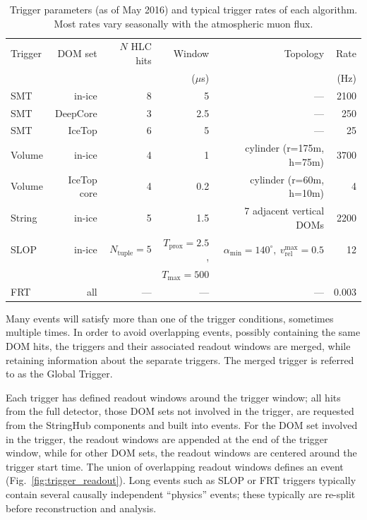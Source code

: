 \begin{table}
  \centering \footnotesize
\caption{Trigger parameters (as of May 2016) and typical trigger
  rates of each algorithm.  Most rates vary seasonally with the atmospheric
  muon flux.}  
\begin{tabular}{lrrrrr}
  \hline Trigger & DOM set & $N$ HLC hits & Window & Topology & Rate\\
  & & & ($\mu$s) & & (Hz) \\
  \hline
  SMT & in-ice & 8 & 5 & --- & 2100\\
  SMT & DeepCore & 3 & 2.5 & --- & 250\\
  SMT & IceTop & 6 & 5 & --- & 25\\
  Volume & in-ice & 4 & 1 & cylinder (r=175m, h=75m) & 3700\\
  Volume & IceTop core & 4 & 0.2 & cylinder (r=60m, h=10m) & 4\\
  String & in-ice & 5 & 1.5 & 7 adjacent vertical DOMs & 2200\\
  SLOP & in-ice & $N_{\mathrm{tuple}} = 5$ & $T_{\mathrm{prox}} = 2.5$, &
  $\alpha_{\mathrm{min}} = 140^\circ,\ v_{\mathrm{rel}}^{\mathrm{max}} = 0.5$ & 12\\
  & & & $T_{\mathrm{max}} = 500$ & &\\
  FRT & all & --- & --- & --- & 0.003\\
  \hline
\end{tabular}
\label{tab:triggers}
\end{table}

Many events will satisfy more than one of the trigger conditions, sometimes
multiple times.  In order to avoid overlapping events, possibly containing
the same DOM hits, the triggers and their associated readout windows are
merged, while retaining information about the separate triggers.  The
merged trigger is referred to as the Global Trigger.

Each trigger has defined readout windows around the trigger window; all
hits from the full detector, those DOM sets not involved in the trigger,
are requested from the StringHub components and built into events.  For the
DOM set involved in the trigger, the readout windows are appended at the end of the trigger
window, while for other DOM sets, the readout windows are centered around
the trigger start time.  The union of overlapping readout windows defines
an event (Fig.~\ref{fig:trigger_readout}).  Long events such as SLOP or FRT
triggers typically contain several causally independent ``physics'' events;
these typically are re-split before reconstruction and analysis.

